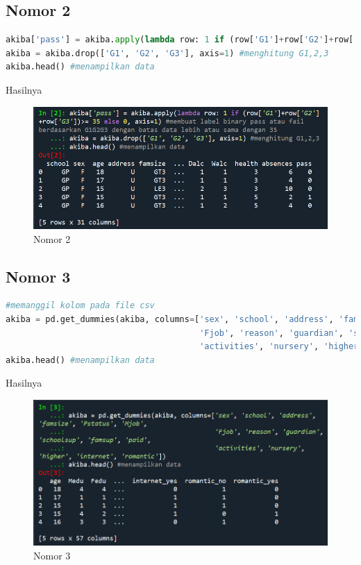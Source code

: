 \subsection{Nomor 2}

\begin{lstlisting}[language=Python]
akiba['pass'] = akiba.apply(lambda row: 1 if (row['G1']+row['G2']+row['G3'])>= 35 else 0, axis=1) #membuat label binary pass atau fail berdasarkan G1G2G3 dengan batas data lebih atau sama dengan 35
akiba = akiba.drop(['G1', 'G2', 'G3'], axis=1) #menghitung G1,2,3
akiba.head() #menampilkan data
\end{lstlisting}

\par Hasilnya

\begin{figure}[H]
    \centering
    \includegraphics[width=12cm]{figures/chapter2/20.PNG}
    \caption{Nomor 2}
\end{figure}

\subsection{Nomor 3}

\begin{lstlisting}[language=Python]
#memanggil kolom pada file csv
akiba = pd.get_dummies(akiba, columns=['sex', 'school', 'address', 'famsize', 'Pstatus', 'Mjob',
                                       'Fjob', 'reason', 'guardian', 'schoolsup', 'famsup', 'paid',
                                       'activities', 'nursery', 'higher', 'internet', 'romantic'])
akiba.head() #menampilkan data
\end{lstlisting}

\par Hasilnya

\begin{figure}[H]
    \centering
    \includegraphics[width=12cm]{figures/chapter2/21.PNG}
    \caption{Nomor 3}
\end{figure}

